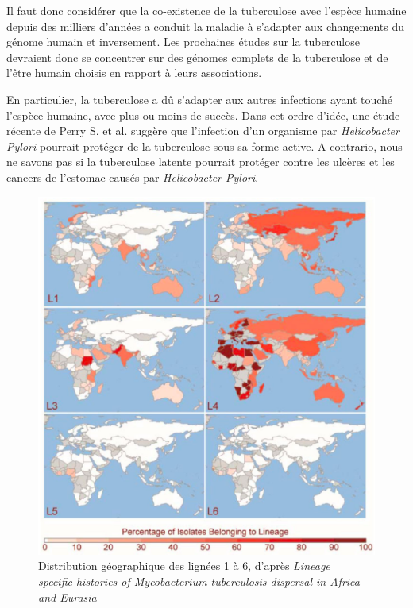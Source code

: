 \documentclass[twoside,a4paper,11pt,frenchb,openany]{report}
\begin{document}

Il faut donc considérer que la co-existence de la tuberculose avec l'espèce humaine depuis des milliers d'années a conduit la maladie à s'adapter aux changements du génome humain et inversement. Les prochaines études sur la tuberculose devraient donc se concentrer sur des génomes complets de la tuberculose et de l'être humain choisis en rapport à leurs associations.

En particulier, la tuberculose a dû s'adapter aux autres infections ayant touché l'espèce humaine, avec plus ou moins de succès. Dans cet ordre d'idée, une étude récente de Perry S. et al.\cite{perry1, perry2} suggère que l'infection d'un organisme par \textit{Helicobacter Pylori} pourrait protéger de la tuberculose sous sa forme active. A contrario, nous ne savons pas si la tuberculose latente pourrait protéger contre les ulcères et les cancers de l'estomac causés par \textit{Helicobacter Pylori}.

\begin{figure}
\centering
\includegraphics[scale=0.5]{world.png}
\caption{Distribution géographique des lignées 1 à 6, d'après \textit{Lineage\\ specific histories of Mycobacterium tuberculosis dispersal in Africa and Eurasia}}
\end{figure}
\end{document}
